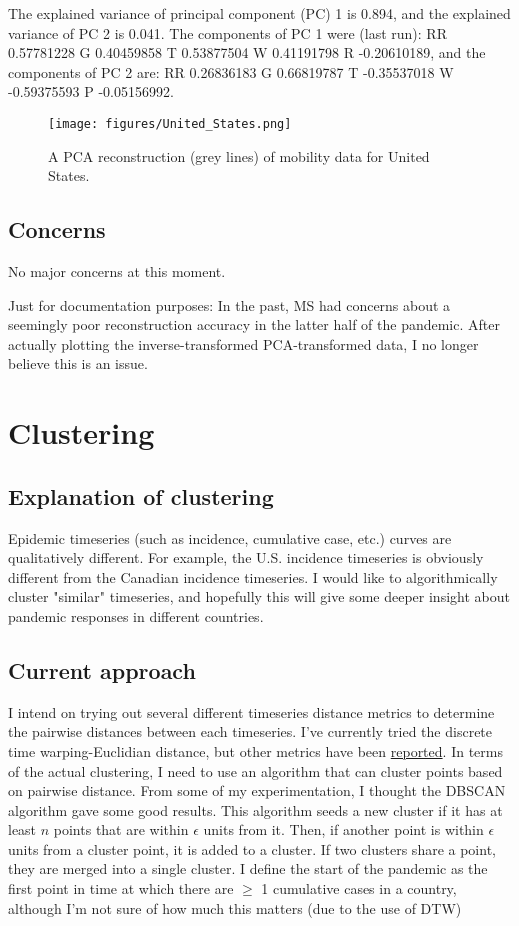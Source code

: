 \documentclass{article}
\begin{document}
The explained variance of principal component (PC) 1 is 0.894, and the explained variance of PC 2 is 0.041. The components of PC 1 were (last run): RR 0.57781228  G 0.40459858 T 0.53877504  W 0.41191798 R -0.20610189, and the components of PC 2 are: RR 0.26836183  G 0.66819787 T -0.35537018 W -0.59375593 P -0.05156992.

\begin{figure}[h!]
    \centering
    \texttt{[image: figures/United\_States.png]}
    \caption{A PCA reconstruction (grey lines) of mobility data for United States.}
    \label{fig:my_label}
\end{figure}


\subsection{Concerns}
No major concerns at this moment. 

Just for documentation purposes: In the past, MS had concerns about a seemingly poor reconstruction accuracy in the latter half of the pandemic. After actually plotting the inverse-transformed PCA-transformed data, I no longer believe this is an issue.


\section{Clustering}
\subsection{Explanation of clustering}
Epidemic timeseries (such as incidence, cumulative case, etc.) curves are qualitatively different. For example, the U.S. incidence timeseries is obviously different from the Canadian incidence timeseries. I would like to algorithmically cluster "similar" timeseries, and hopefully this will give some deeper insight about pandemic responses in different countries. 

\subsection{Current approach}
I intend on trying out several different timeseries distance metrics to determine the pairwise distances between each timeseries. I've currently tried the discrete time warping-Euclidian distance, but other metrics have been \href{https://link.springer.com/chapter/10.1007/978-3-030-28665-1_31}{reported}. In terms of the actual clustering, I need to use an algorithm that can cluster points based on pairwise distance. From some of my experimentation, I thought the DBSCAN algorithm gave some good results. This algorithm seeds a new cluster if it has at least $n$ points that are within $\epsilon$ units from it. Then, if another point is within $\epsilon$ units from a cluster point, it is added to a cluster. If two clusters share a point, they are merged into a single cluster. I define the start of the pandemic as the first point in time at which there are $\geq$ 1 cumulative cases in a country, although I'm not sure of how much this matters (due to the use of DTW)
\end{document}
